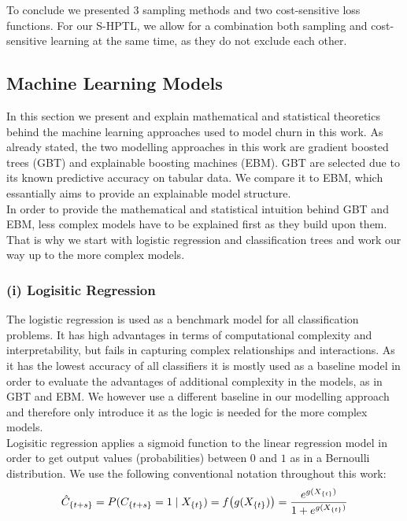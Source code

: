 \documentclass[12pt,titlepage]{article}
\begin{document}
\noindent
To conclude we presented 3 sampling methods and two cost-sensitive loss functions. For our S-HPTL, we allow for a combination both sampling and cost-sensitive learning at the same time, as they do not exclude each other. \\


\subsection{Machine Learning Models} \par
\label{chap:mlmodels}

In this section we present and explain mathematical and statistical theoretics behind the machine learning approaches used to model churn in this work. As already stated, the two modelling approaches in this work are gradient boosted trees (GBT) and explainable boosting machines (EBM). GBT are selected due to its known predictive accuracy on tabular data. We compare it to EBM, which essantially aims to provide an explainable model structure. \\
In order to provide the mathematical and statistical intuition behind GBT and EBM, less complex models have to be explained first as they build upon them. That is why we start with logistic regression and classification trees and work our way up to the more complex models. \\

\subsubsection*{(i) Logisitic Regression}
The logistic regression is used as a benchmark model for all classification problems. It has high advantages in terms of computational complexity and interpretability, but fails in capturing complex relationships and interactions. As it has the lowest accuracy of all classifiers it is mostly used as a baseline model in order to evaluate the advantages of additional complexity in the models, as in GBT and EBM. We however use a different baseline in our modelling approach and therefore only introduce it as the logic is needed for the more complex models.\\
Logisitic regression applies a sigmoid function to the linear regression model in order to get output values (probabilities) between $0$ and $1$ as in a Bernoulli distribution. We use the following conventional notation throughout this work:
\vspace{5mm}
\noindent
\begin{equation} \label{bern_dist}
    \hat{C}_{\{t+s\}} = P(C_{\{t+s\}}=1\mid X_{\{t\}}) = f\big(g(X_{\{t\}})\big) = \frac{e^{g(X_{\{t\}})}}{1 + e^{g(X_{\{t\}})}} \\
\end{equation}
\vspace{1mm}
\end{document}
